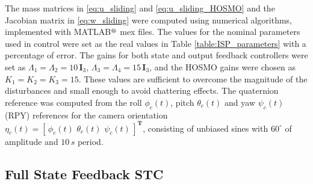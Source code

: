 The mass matrices in \eqref{eq:u_sliding} and \eqref{eq:u_sliding_HOSMO} and the Jacobian matrix in \eqref{eq:w_sliding} were computed using 
numerical algorithms, implemented with MATLAB$^\text{{\tiny{\circledR}}}$ mex files.
%
The values for the nominal parameters used in control were set as the real values
in Table \ref{table:ISP_parameters} with a percentage of error.
%
The gains for both state and output feedback controllers were set as $\Lambda_1 = \Lambda_2 = 10 \, \mathbf{I}_3$, $\Lambda_3 = \Lambda_4 = 15 \, \mathbf{I}_3$, and the HOSMO gains were chosen as $K_1 = K_2 = K_3 = 15$. These values are sufficient to overcome the magnitude of the disturbances and small enough to avoid chattering effects.
%
The quaternion reference was computed from the roll $\phi_{c}(t)$, pitch $\theta_{c}(t)$ and yaw $\psi_{c}(t)$ (RPY) references for the camera orientation $\eta_{c}(t) = [\, \phi_{c}(t) \,\, \theta_{c}(t) \,\, \psi_{c}(t) \,]^\mathbf{T}$, consisting of unbiased sines with $60^\circ$ of amplitude and $10 \, s$ period.

\subsection{Full State Feedback STC}

